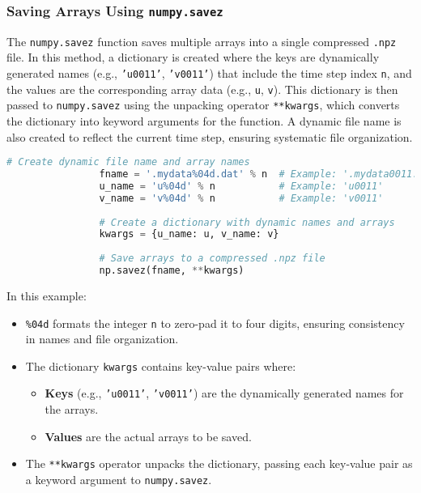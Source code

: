 \documentclass{article}
\begin{document}
			\subsubsection{Saving Arrays Using \texttt{numpy.savez}}
			\begin{comment}
				
			The \texttt{numpy.savez} function is a flexible and efficient way to save multiple arrays into a single compressed \texttt{.npz} file, particularly useful in simulations where arrays are generated dynamically at each time step. By leveraging the unpacking operator \texttt{**kwargs}, it becomes straightforward to save arrays with dynamic names that reflect the specific time step.
			content...
			\end{comment}
			The \texttt{numpy.savez} function saves multiple arrays into a single compressed \texttt{.npz} file.
			In this method, a dictionary  is created where the keys are dynamically generated names (e.g., \texttt{'u0011'}, \texttt{'v0011'}) that include the time step index \texttt{n}, and the values are the corresponding array data (e.g., \texttt{u}, \texttt{v}). This dictionary is then passed to \texttt{numpy.savez} using the unpacking operator \texttt{**kwargs}, which converts the dictionary into keyword arguments for the function. A dynamic file name is also created to reflect the current time step, ensuring systematic file organization.
			
			\begin{lstlisting}[language=Python]
				# Create dynamic file name and array names
				fname = '.mydata%04d.dat' % n  # Example: '.mydata0011.dat'
				u_name = 'u%04d' % n           # Example: 'u0011'
				v_name = 'v%04d' % n           # Example: 'v0011'
				
				# Create a dictionary with dynamic names and arrays
				kwargs = {u_name: u, v_name: v}
				
				# Save arrays to a compressed .npz file
				np.savez(fname, **kwargs)
			\end{lstlisting}
			
			In this example:
			\begin{itemize}
				\item \texttt{\%04d} formats the integer \texttt{n} to zero-pad it to four digits, ensuring consistency in names and file organization.
				\item The dictionary \texttt{kwargs} contains key-value pairs where:
				\begin{itemize}
					\item \textbf{Keys} (e.g., \texttt{'u0011'}, \texttt{'v0011'}) are the dynamically generated names for the arrays.
					\item \textbf{Values} are the actual arrays to be saved.
				\end{itemize}
				\item The \texttt{**kwargs} operator unpacks the dictionary, passing each key-value pair as a keyword argument to \texttt{numpy.savez}.
			\end{itemize}
			
\end{document}
